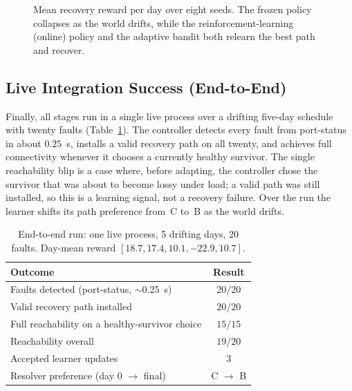 \documentclass[12pt,a4paper]{report}
\begin{document}
\begin{figure}[t]
\centering
{}
\caption{Mean recovery reward per day over eight seeds. The frozen policy collapses as the
world drifts, while the reinforcement-learning (online) policy and the adaptive bandit both
relearn the best path and recover.}
\label{fig:learncurve}
\end{figure}

\subsection{Live Integration Success (End-to-End)}
Finally, all stages run in a single live process over a drifting five-day schedule with
twenty faults (Table~\ref{tab:e2e}). The controller detects every fault from port-status in
about $0.25$~s, installs a valid recovery path on all twenty, and achieves full connectivity
whenever it chooses a currently healthy survivor. The single reachability blip is a case
where, before adapting, the controller chose the survivor that was about to become lossy
under load; a valid path was still installed, so this is a learning signal, not a recovery
failure. Over the run the learner shifts its path preference from~C to~B as the world drifts.

\begin{table}[t]
\centering
\footnotesize
\caption{End-to-end run: one live process, 5 drifting days, 20 faults. Day-mean reward
$[18.7, 17.4, 10.1, -22.9, 10.7]$.}
\label{tab:e2e}
\begin{tabular}{lc}
\toprule
Outcome & Result \\
\midrule
Faults detected (port-status, $\sim$0.25~s) & $20/20$ \\
Valid recovery path installed & $20/20$ \\
Full reachability on a healthy-survivor choice & $15/15$ \\
Reachability overall & $19/20$ \\
Accepted learner updates & 3 \\
Resolver preference (day 0 $\rightarrow$ final) & C $\rightarrow$ B \\
\bottomrule
\end{tabular}
\end{table}
\end{document}
